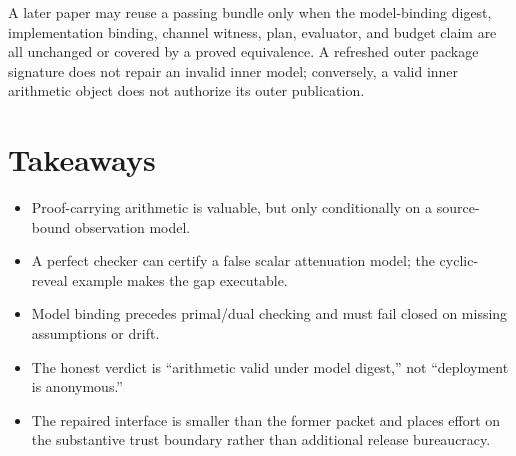 \documentclass[11pt]{article}
\begin{document}
A later paper may reuse a passing bundle only when the model-binding digest, implementation binding, channel witness, plan, evaluator, and budget claim are all unchanged or covered by a proved equivalence. A refreshed outer package signature does not repair an invalid inner model; conversely, a valid inner arithmetic object does not authorize its outer publication.

\section{Takeaways}
\begin{itemize}[leftmargin=*]
\item Proof-carrying arithmetic is valuable, but only conditionally on a source-bound observation model.
\item A perfect checker can certify a false scalar attenuation model; the cyclic-reveal example makes the gap executable.
\item Model binding precedes primal/dual checking and must fail closed on missing assumptions or drift.
\item The honest verdict is ``arithmetic valid under model digest,'' not ``deployment is anonymous.''
\item The repaired interface is smaller than the former packet and places effort on the substantive trust boundary rather than additional release bureaucracy.
\end{itemize}
\end{document}
